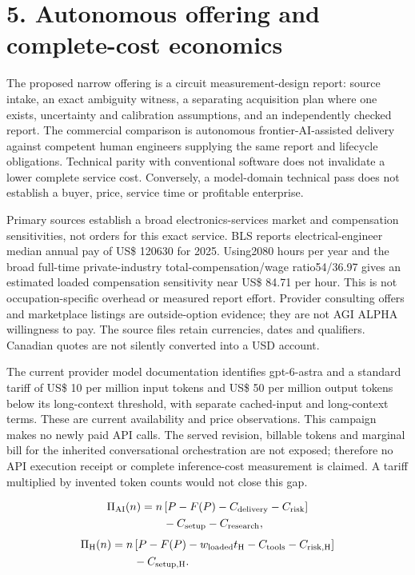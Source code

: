 \documentclass[10pt,letterpaper]{article}
\begin{document}
\section*{\color{accent}5. Autonomous offering and complete-cost economics}
The proposed narrow offering is a circuit measurement-design report: source intake, an exact ambiguity witness, a separating acquisition plan where one exists, uncertainty and calibration assumptions, and an independently checked report. The commercial comparison is autonomous frontier-AI-assisted delivery against competent human engineers supplying the same report and lifecycle obligations. Technical parity with conventional software does not invalidate a lower complete service cost. Conversely, a model-domain technical pass does not establish a buyer, price, service time or profitable enterprise.\par
Primary sources establish a broad electronics-services market and compensation sensitivities, not orders for this exact service. BLS reports electrical-engineer median annual pay of US\$ 120630 for 2025. Using2080 hours per year and the broad full-time private-industry total-compensation/wage ratio54/36.97 gives an estimated loaded compensation sensitivity near US\$ 84.71 per hour. This is not occupation-specific overhead or measured report effort. Provider consulting offers and marketplace listings are outside-option evidence; they are not AGI ALPHA willingness to pay. The source files retain currencies, dates and qualifiers. Canadian quotes are not silently converted into a USD account.\par
The current provider model documentation identifies gpt-6-astra and a standard tariff of US\$ 10 per million input tokens and US\$ 50 per million output tokens below its long-context threshold, with separate cached-input and long-context terms. These are current availability and price observations. This campaign makes no newly paid API calls. The served revision, billable tokens and marginal bill for the inherited conversational orchestration are not exposed; therefore no API execution receipt or complete inference-cost measurement is claimed. A tariff multiplied by invented token counts would not close this gap.\par
\[ \begin{aligned}\Pi_{\rm AI}(n)&=n\,[P-F(P)-C_{\rm delivery}-C_{\rm risk}]\\&\qquad-C_{\rm setup}-C_{\rm research},\end{aligned} \]
\[ \begin{aligned}\Pi_{\rm H}(n)&=n\,[P-F(P)-w_{\rm loaded}t_{\rm H}-C_{\rm tools}-C_{\rm risk,H}]\\&\qquad-C_{\rm setup,H}.\end{aligned} \]
\end{document}
